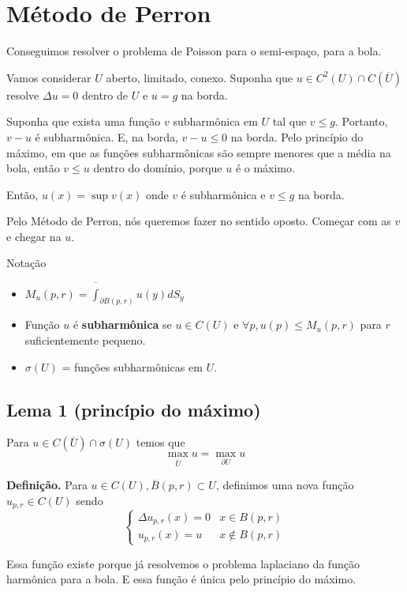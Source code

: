 \documentclass[11pt]{article}
\newcommand{\p}{\partial}
\begin{document}
\section{Método de Perron}

Conseguimos resolver o problema de Poisson para o semi-espaço, para a bola. 

Vamos considerar \(U\) aberto, limitado, conexo. Suponha que \(u \in C^2 (U) \cap C(\overline{U})\) resolve \(\Delta u = 0\) dentro de \(U\) e \(u=g\) na borda.

Suponha que exista uma função \(v\) subharmônica em \(U\) tal que \(v \leq g\). Portanto, \(v - u\) é subharmônica. E, na borda, \(v-u\leq 0 \) na borda. Pelo princípio do máximo, em que as funções subharmônicas são sempre menores que a média na bola, então \(v \leq u\) dentro do domínio, porque \(u\) é o máximo.

Então, \(u(x) = \sup v(x)\) onde \(v\) é subharmônica e \(v \leq g\) na borda.

Pelo Método de Perron, nós queremos fazer no sentido oposto. Começar com as \(v\) e chegar na \(u\). 

Notação
\begin{itemize}
	\item \(M_u (p,r) = \overline{\int}_{\p B(p,r)} u(y) dS_y \)
	\item Função \(u\) é \textbf{subharmônica} se \(u \in C(U)\) e \(\forall p, u(p) \leq M_u (p,r)\) para \(r\) suficientemente pequeno.
	\item \(\sigma(U)\) = funções subharmônicas em \(U\).
\end{itemize} 

\subsection*{Lema 1 (princípio do máximo)}

Para \(u \in C(\overline{U}) \cap \sigma(U)\) temos que \[\max_{\overline{U}} u = \max_{\p U} u\]

\textbf{Definição. } Para \(u \in C(U), \overline{B}(p,r) \subset U\), definimos uma nova função \(u_{p,r} \in C(U)\) sendo \[\begin{cases}
	\Delta u_{p,r} (x) =0  & x \in B(p,r) \\
	u_{p,r}(x) = u & x \notin B(p,r)
\end{cases}\]

Essa função existe porque já resolvemos o problema laplaciano da função harmônica para a bola. E essa função é única pelo princípio do máximo.
\end{document}
